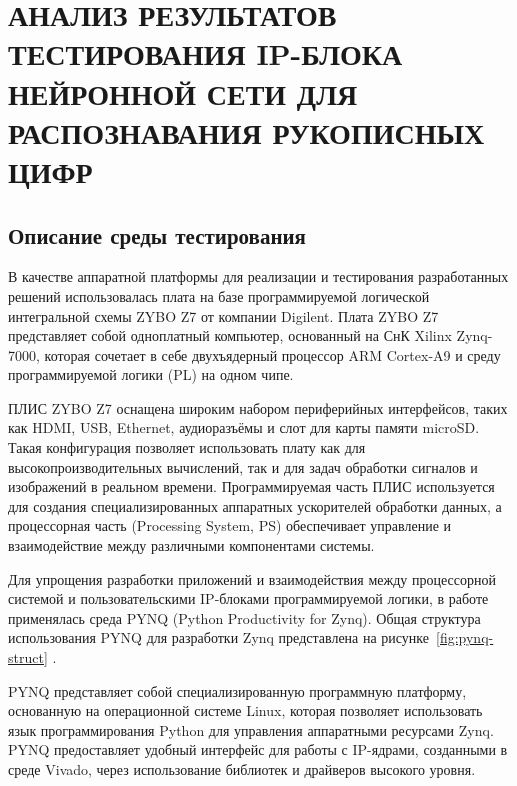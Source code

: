 \chapter[Анализ результатов тестирования IP-блока нейронной сети для распознавания рукописных цифр]
{АНАЛИЗ РЕЗУЛЬТАТОВ ТЕСТИРОВАНИЯ IP-БЛОКА НЕЙРОННОЙ СЕТИ ДЛЯ РАСПОЗНАВАНИЯ РУКОПИСНЫХ ЦИФР}

\section{Описание среды тестирования}\par
\hspace*{12.5 mm}В качестве аппаратной платформы для реализации и тестирования 
разработанных решений использовалась плата на базе программируемой логической 
интегральной схемы ZYBO Z7 от компании Digilent. Плата ZYBO Z7 представляет 
собой одноплатный компьютер, основанный на СнК Xilinx Zynq-7000, которая 
сочетает в себе двухъядерный процессор ARM Cortex-A9 и среду программируемой 
логики (PL) на одном чипе\cite{ZYBO}.

ПЛИС ZYBO Z7 оснащена широким набором периферийных интерфейсов, таких как HDMI, 
USB, Ethernet, аудиоразъёмы и слот для карты памяти microSD. Такая конфигурация
позволяет использовать плату как для высокопроизводительных вычислений, так и 
для задач обработки сигналов и изображений в реальном времени. Программируемая 
часть ПЛИС используется для создания специализированных аппаратных ускорителей 
обработки данных, а процессорная часть (Processing System, PS) обеспечивает 
управление и взаимодействие между различными компонентами системы\cite{ZYNQ}.

Для упрощения разработки приложений и взаимодействия между процессорной 
системой и пользовательскими IP-блоками программируемой логики, в работе 
применялась среда PYNQ (Python Productivity for Zynq). 
Общая структура использования PYNQ для разработки Zynq представлена на 
рисунке~\ref{fig:pynq-struct} \cite{PYNQ-IMG}.


PYNQ представляет собой 
специализированную программную платформу, основанную на операционной системе 
Linux, которая позволяет использовать язык программирования Python для 
управления аппаратными ресурсами Zynq\cite{PYNQ}. PYNQ предоставляет удобный интерфейс
для работы с IP-ядрами, созданными в среде Vivado, через использование 
библиотек и драйверов высокого уровня.


